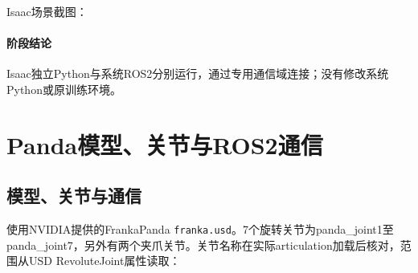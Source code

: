 Isaac场景截图：



\paragraph{阶段结论}Isaac独立Python与系统ROS2分别运行，通过专用通信域连接；没有修改系统Python或原训练环境。


\FloatBarrier

\section{Panda模型、关节与ROS2通信}

\label{stage:s02}

\subsection{模型、关节与通信}\label{s02-detail-1}

使用NVIDIA提供的FrankaPanda \texttt{franka.usd}。7个旋转关节为panda\_joint1至panda\_joint7，另外有两个夹爪关节。关节名称在实际articulation加载后核对，范围从USD RevoluteJoint属性读取：

